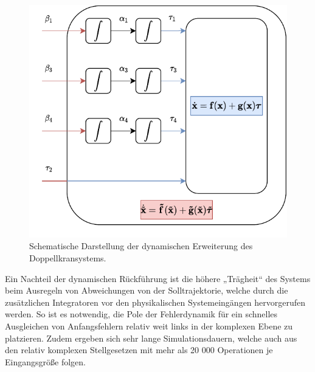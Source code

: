 \begin{figure}[ht]
	\begin{center}
		\includegraphics[scale=1]{Pictures/dynamic_extension}
	\end{center}
	\caption[Schematische Darstellung dynamischer Erweiterung des Doppellkransystems]
	{Schematische Darstellung der dynamischen Erweiterung des Doppellkransystems.}
	\label{fig:dynamic_extension_diagram}
\end{figure}

Ein Nachteil der dynamischen Rückführung ist die höhere „Trägheit“ des Systems beim Ausregeln von Abweichungen von der Solltrajektorie, welche durch die zusätzlichen Integratoren vor den physikalischen Systemeingängen hervorgerufen werden. So ist es notwendig, die Pole der Fehlerdynamik für ein schnelles Ausgleichen von Anfangsfehlern relativ weit links in der komplexen Ebene zu platzieren. Zudem ergeben sich sehr lange Simulationsdauern, welche auch aus den relativ komplexen Stellgesetzen mit mehr als 20 000 Operationen je Eingangsgröße folgen. 

